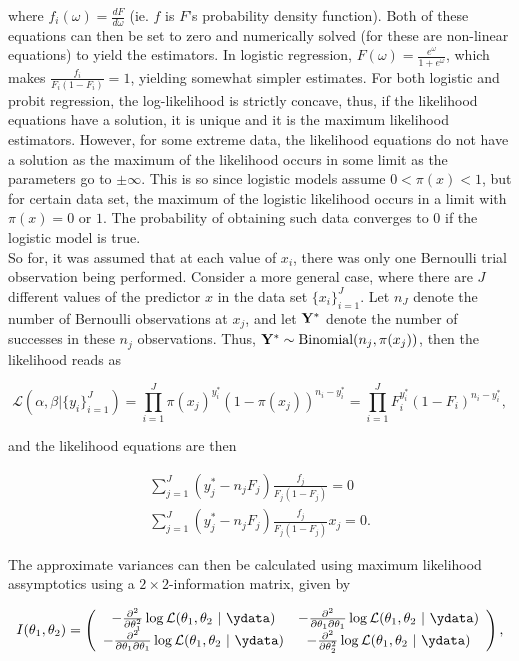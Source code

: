 \documentclass{homework}
\begin{document}
where $f_i (\omega) = \frac{dF}{d\omega}$ (ie. $f$ is $F$'s probability density function). Both of these equations can then be set to zero and numerically solved (for these are non-linear equations) to yield the estimators. In logistic regression, $F(\omega) = \frac{e^{\omega}}{1+e^{\omega}}$, which makes $\frac{f_i}{F_i(1-F_i)} = 1$, yielding somewhat simpler estimates. For both logistic and probit regression, the log-likelihood is strictly concave, thus, if the likelihood equations have a solution, it is unique and it is the maximum likelihood estimators. However, for some extreme data, the likelihood equations do not have a solution as the maximum of the likelihood occurs in some limit as the parameters go to $ \pm \infty$. This is so since logistic models assume $0<\pi(x)<1$, but for certain data set, the maximum of the logistic likelihood occurs in a limit with $\pi(x) = 0$ or $1$. The probability of obtaining such data converges to 0 if the logistic model is true. \\

So for, it was assumed that at each value of $x_i$, there was only one Bernoulli trial observation being performed. Consider a more general case, where there are $J$ different values of the predictor $x$ in the data set $\{x_i\}_{i=1}^{J}$. Let $n_J$ denote the number of Bernoulli observations at $x_j$, and let ${\bf Y}^{*}$ denote the number of successes in these $n_j$ observations. Thus, ${\bf Y}^{*} \sim \textnormal{Binomial}(n_j, \pi(x_j))$, then the likelihood reads as 

\begin{equation}
\mathcal{L}(\alpha, \beta | \{y_i\}_{i=1}^{J}) = \prod_{i=1}^{J} \pi(x_j)^{y_i^{*}} (1-\pi(x_j))^{n_i-y_i^{*}} = \prod_{i=1}^{J} F_i^{y_i^{*}} (1-F_i)^{n_i-y_i^{*}},
\end{equation}

and the likelihood equations are then 

\begin{align}
     \sum_{j=1}^{J} (y_j^{*} - n_j F_j) \frac{f_j}{F_j (1-F_j)} = 0 \\
    \sum_{j=1}^{J} (y_j^{*} - n_j F_j) \frac{f_j}{F_j (1-F_j)} x_j = 0.
\end{align}

The approximate variances can then be calculated using maximum likelihood assymptotics using a $2 \times 2$-information matrix, given by 

\begin{equation}
    I(\theta_1, \theta_2) = \left(\begin{array}{cc}
        -\frac{\partial^2}{\partial \theta_1^2} \log \mathcal{L}(\theta_1, \theta_2 \blank |\blank \ydata) & -\frac{\partial^2}{\partial \theta_1 \partial \theta_1} \log \mathcal{L}(\theta_1, \theta_2 \blank |\blank \ydata) \\
         -\frac{\partial^2}{\partial \theta_1 \partial \theta_1} \log \mathcal{L}(\theta_1, \theta_2 \blank |\blank \ydata) & -\frac{\partial^2}{\partial \theta_2^2} \log \mathcal{L}(\theta_1, \theta_2 \blank |\blank \ydata)
    \end{array}\right),
\end{equation}
\end{document}
